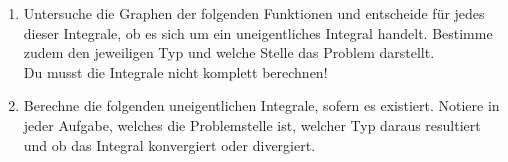 	\begin{aufgabe}
		\begin{enumerate}
			\item Untersuche die Graphen der folgenden Funktionen und entscheide für jedes dieser Integrale, ob es sich um ein uneigentliches Integral handelt. Bestimme zudem den jeweiligen Typ und welche Stelle das Problem darstellt.\\ Du musst die Integrale nicht komplett berechnen!
			\item Berechne die folgenden uneigentlichen Integrale, sofern es existiert. Notiere in jeder Aufgabe, welches die Problemstelle ist, welcher Typ daraus resultiert und ob das Integral konvergiert oder divergiert.
		\end{enumerate}
	\end{aufgabe}

